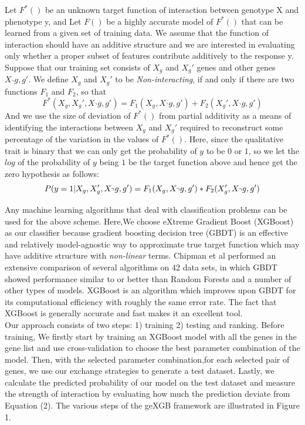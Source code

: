 \documentclass[11pt]{article}
\theoremstyle{plain}
\theoremstyle{definition}
\theoremstyle{remark}
\begin{document}
\noindent Let $F^*()$ be an unknown target function of interaction between genotype X and phenotype y, and Let $F()$ be a highly accurate model of $F^*()$ that can be learned from a given set of training data. We assume that the function of interaction should have an additive structure and we are interested in evaluating only whether a proper subset of features contribute additively to the response y. Suppose that our training set consists of $X_g$ and $X_g'$ genes and other genes $X_\urcorner g,g'$. We define $X_g$ and $X_g'$ to be {\em Non-interacting}, if and only if there are two functions $F_1$ and $F_2$, so that
\begin{equation}
F^*(X_g,X_g',X_\urcorner g,g') = F_1(X_g,X_\urcorner g,g')+F_2(X_g',X_\urcorner g,g')
\end{equation}
\noindent And we use the size of deviation of $F^*()$ from partial additivity as a means of identifying the interactions between $X_g$ and $X_g'$ required to reconstruct some percentage of the variation in the values of $F^*()$. Here, since the qualitative trait is binary that we can only get the probability of $y$ to be $0$ or $1$, so we let the $log$ of the probability of $y$ being $1$ be the target function above and hence get the zero hypothesis as follows:
\begin{equation}
P(y=1|X_g,X_g',X_\urcorner g,g')=F_1(X_g,X_\urcorner g,g')*F_2(X_g',X_\urcorner g,g')\\
\end{equation}

\noindent Any machine learning algorithms that deal with classification problems can be used for the above scheme. Here,We choose eXtreme Gradient Boost (XGBoost) as our classifier because gradient boosting decision tree (GBDT) is an effective and relatively model-agnostic way to approximate true target function which may have additive structure with {\em non-linear} terms. Chipman et al performed an extensive comparison of several algorithms on 42 data sets, in which GBDT showed performance similar to or better than Random Forests and a number of other types of models. XGBoost is an algorithm which improves upon GBDT for its computational efficiency with roughly the same error rate. The fact that XGBoost is generally accurate and fast makes it an excellent tool.\\

\noindent Our approach consists of two steps: 1) training 2) testing and ranking. Before training, We firstly start by training an XGBoost model with all the genes in the gene list and use cross-validation to choose the best parameter combination of the model. Then, with the selected parameter combination,for each selected pair of genes, we use our exchange strategies to generate a test dataset. Lastly, we calculate the predicted probability of our model on the test dataset and measure the strength of interaction by evaluating how much the prediction deviate from Equation (2). The various steps of the geXGB framework are illustrated in Figure 1.
\end{document}
